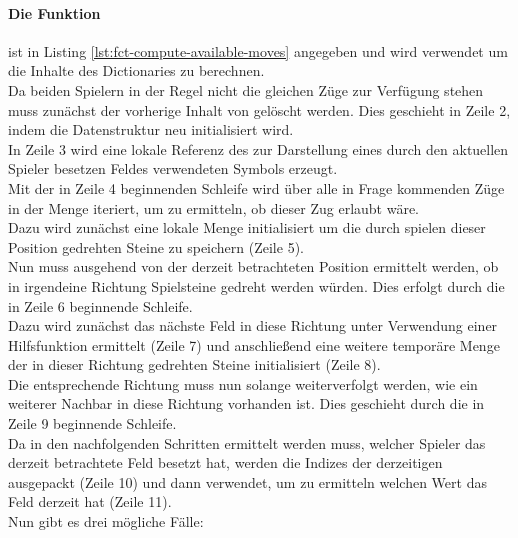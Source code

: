 \paragraph{Die Funktion }
 ist in Listing \ref{lst:fct-compute-available-moves} angegeben und wird verwendet um die Inhalte des Dictionaries  zu berechnen.
\\Da beiden Spielern in der Regel nicht die gleichen Züge zur Verfügung stehen muss zunächst der vorherige Inhalt von  gelöscht werden. Dies geschieht in Zeile 2, indem die Datenstruktur neu initialisiert wird.
\\In Zeile 3 wird eine lokale Referenz des zur Darstellung eines durch den aktuellen Spieler besetzen Feldes verwendeten Symbols erzeugt.
\\Mit der in Zeile 4 beginnenden Schleife wird über alle in Frage kommenden Züge in der Menge  iteriert, um zu ermitteln, ob dieser Zug erlaubt wäre.
\\Dazu wird zunächst eine lokale Menge initialisiert um die durch spielen dieser Position gedrehten Steine zu speichern (Zeile 5).
\\Nun muss ausgehend von der derzeit betrachteten Position ermittelt werden, ob in irgendeine Richtung Spielsteine gedreht werden würden. Dies erfolgt durch die in Zeile 6 beginnende Schleife.
\\Dazu wird zunächst das nächste Feld in diese Richtung unter Verwendung einer Hilfsfunktion ermittelt (Zeile 7) und anschließend eine weitere temporäre Menge der in dieser Richtung gedrehten Steine initialisiert (Zeile 8).
\\Die entsprechende Richtung muss nun solange weiterverfolgt werden, wie ein weiterer Nachbar in diese Richtung vorhanden ist. Dies geschieht durch die in Zeile 9 beginnende Schleife.
\\Da in den nachfolgenden Schritten ermittelt werden muss, welcher Spieler das derzeit betrachtete Feld besetzt hat, werden die Indizes der derzeitigen  ausgepackt (Zeile 10) und dann verwendet, um zu ermitteln welchen Wert das Feld derzeit hat (Zeile 11).
\\Nun gibt es drei mögliche Fälle:
